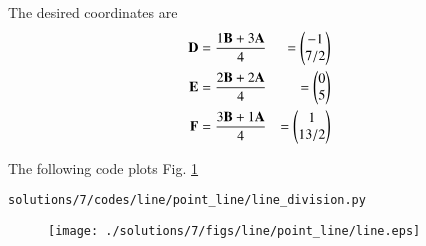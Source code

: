The desired coordinates are
\begin{align}
\mathbf{D} &= \frac{1\mathbf{B}+3\mathbf{A}}{4} &= \begin{pmatrix}-1\\7/2\end{pmatrix}\\
\mathbf{E} &= \frac{2\mathbf{B}+2\mathbf{A}}{4} &= \begin{pmatrix}0\\5\end{pmatrix}\\
\mathbf{F} &= \frac{3\mathbf{B}+1\mathbf{A}}{4} &= \begin{pmatrix}1\\13/2\end{pmatrix}
\end{align}

The following code plots Fig. \ref{fig:3.6.7}
\begin{lstlisting}
solutions/7/codes/line/point_line/line_division.py
\end{lstlisting}

\begin{figure}[!ht]
\centering
\texttt{[image: ./solutions/7/figs/line/point\_line/line.eps]}
\caption{}
\label{fig:3.6.7}
\end{figure}

